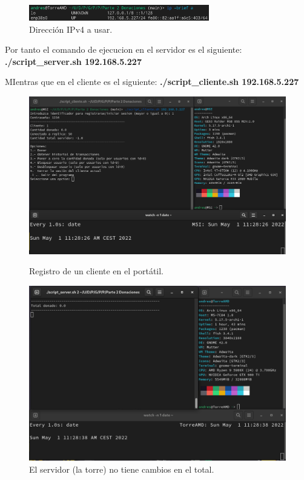 \documentclass{article}
\begin{document}
\begin{figure}[H]
    \centering
    \includegraphics[width=0.7\textwidth]{imagenes/multiples ordenadores/IP.png}
    \caption{Dirección IPv4 a usar.}
\end{figure}

Por tanto el comando de ejecucion en el servidor es el siguiente: \textbf{./script\_server.sh 192.168.5.227}

MIentras que en el cliente es el siguiente: \textbf{./script\_cliente.sh 192.168.5.227}

\begin{figure}[H]
    \centering
    \begin{minipage}[H]{0.45\textwidth}
        \centering
        \includegraphics[width=\textwidth]{imagenes/multiples ordenadores/Cliente/Screenshot from 2022-05-01 11-29-01.png}
        \caption{Registro de un cliente en el portátil.}
    \end{minipage}
    \hfill
    \begin{minipage}[H]{0.45\textwidth}
        \centering
        \includegraphics[width=\textwidth]{imagenes/multiples ordenadores/Servidor/Screenshot from 2022-05-01 11-29-01.png}
        \caption{El servidor (la torre) no tiene cambios en el total.}
    \end{minipage}
\end{figure}
\end{document}
